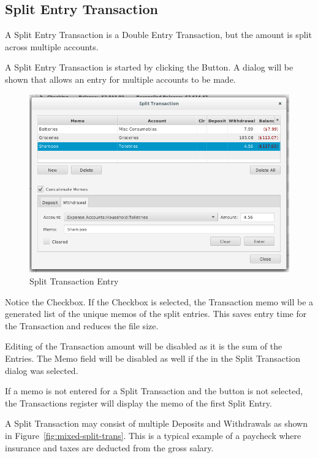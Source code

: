 \documentclass[letterpaper,12pt]{book}
\begin{document}
    \subsection{Split Entry Transaction}
    A Split Entry Transaction is a Double Entry Transaction, but the amount is split across multiple accounts.

    A Split Entry Transaction is started by clicking the  Button. A dialog will be shown that allows an entry
    for multiple accounts to be made.

    \begin{figure}[H]
        \caption{Split Transaction Entry}
        \includegraphics[width=1.0\linewidth]{images/splitTransactionEntry}
    \end{figure}

    Notice the  Checkbox. If the Checkbox is selected, the Transaction memo will be a generated list
    of the unique memos of the split entries. This saves entry time for the Transaction and reduces the file size.

    Editing of the Transaction amount will be disabled as it is the sum of the Entries. The Memo field will be disabled
    as well if the  in the Split Transaction dialog was selected.

    If a memo is not entered for a Split Transaction and the  button is not selected, the
    Transactions register will display the memo of the first Split Entry.

    A Split Transaction may consist of multiple Deposits and Withdrawals as shown in Figure~\ref{fig:mixed-split-trans}. 
    This is a typical example of a paycheck where insurance and taxes are deducted from the gross salary.
\end{document}
